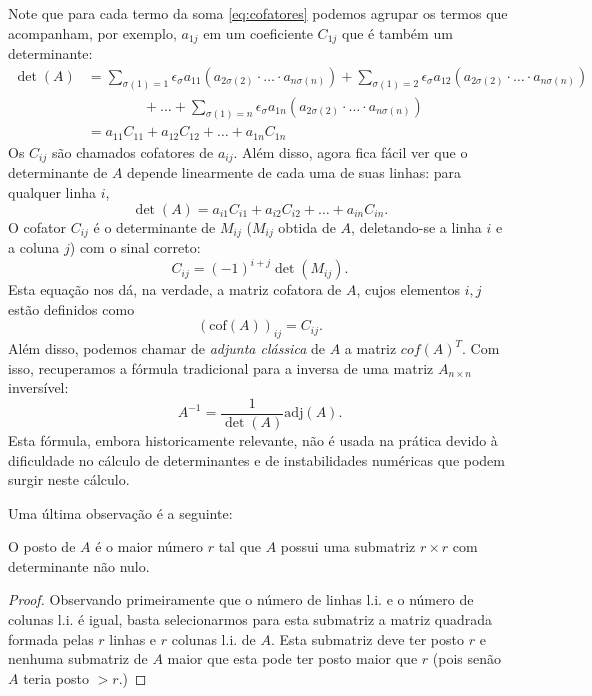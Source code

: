 Note que para cada termo da soma \eqref{eq:cofatores} podemos agrupar os termos que acompanham, por exemplo, $a_{1j}$ em um coeficiente $C_{1j}$ que é também um determinante:
\begin{align*}
   \det(A) &=\sum_{\sigma(1)=1} \epsilon_{\sigma} a_{11} (a_{2\sigma(2)}\cdot \ldots \cdot a_{n\sigma(n)}) + \sum_{\sigma(1)=2} \epsilon_{\sigma} a_{12} (a_{2\sigma(2)}\cdot \ldots \cdot a_{n\sigma(n)})\\
	& \qquad \qquad {} + \ldots + \sum_{\sigma(1)=n} \epsilon_{\sigma} a_{1n}
	(a_{2\sigma(2)}\cdot \ldots \cdot a_{n\sigma(n)})\\
	&= a_{11} C_{11} + a_{12} C_{12} + \ldots + a_{1n} C_{1n}
\end{align*}
Os $C_{ij}$ são chamados cofatores de $a_{ij}$. Além disso, agora fica fácil ver que o determinante de $A$ depende linearmente de cada uma de suas linhas: para qualquer linha $i$, 
\begin{equation*}
    \det(A) = a_{i1}C_{i1} + a_{i2}C_{i2} + \ldots + a_{in}C_{in}.
\end{equation*}
O cofator $C_{ij}$ é o determinante de $M_{ij}$ ($M_{ij}$ obtida de $A$, deletando-se a linha $i$ e a coluna $j$) com o sinal correto:
\begin{equation*}
    C_{ij} = (-1)^{i+j}\det(M_{ij}).
\end{equation*}
Esta equação nos dá, na verdade, a matriz cofatora de $A$, cujos elementos $i,j$ estão definidos como
\begin{equation*}
   (\text{cof}(A))_{ij} = C_{ij}.
\end{equation*}
Além disso, podemos chamar de \emph{adjunta clássica} de $A$ a matriz  $cof(A)^T$. Com isso, recuperamos a fórmula tradicional para a inversa de uma matriz $A_{n\times n}$ inversível:
\begin{equation*}
   A^{-1} = \frac{1}{\det(A)} \text{adj}(A).
\end{equation*}
Esta fórmula, embora historicamente relevante, não é usada na prática devido à dificuldade no cálculo de determinantes e de instabilidades numéricas que podem surgir neste cálculo.

Uma última observação é a seguinte:
\begin{teo}
   O posto de $A$ é o maior número $r$ tal que $A$ possui uma submatriz $r\times r$ com determinante não nulo.
\end{teo}
\begin{proof}
Observando primeiramente que o número de linhas l.i. e o número de colunas l.i. é igual, basta selecionarmos para esta submatriz a matriz quadrada formada pelas $r$ linhas e $r$ colunas l.i. de $A$. Esta submatriz deve ter posto $r$ e nenhuma submatriz de $A$ maior que esta pode ter posto maior que $r$ (pois senão $A$ teria posto $>r$.)
\end{proof}

